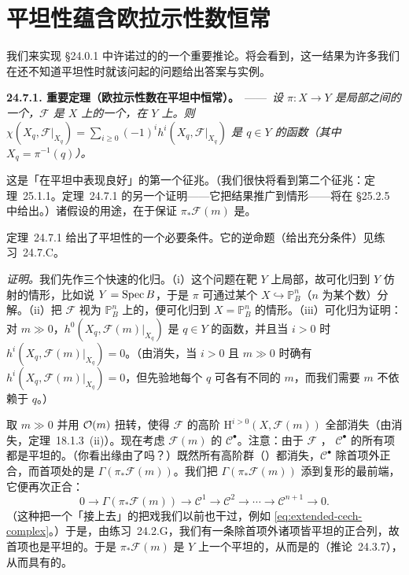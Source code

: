
\section{平坦性蕴含欧拉示性数恒常}

我们来实现 \S24.0.1 中许诺过的\trFlatness{}的一个重要推论。将会看到，这一结果为许多我们在还不知道平坦性时就该问起的问题给出答案与实例。

\textbf{24.7.1. 重要定理（欧拉示性数在平坦\trFamily{}中恒常）。}\ ——\ \emph{设 $\pi\colon X\to Y$ 是局部\trNoether{}\trScheme{}之间的一个\trProjective{}\trMorphism，$\mathscr{F}$ 是 $X$ 上的一个\trCoherentSheaf，在 $Y$ 上\trFlat。则 $\chi(X_q,\mathscr{F}|_{X_q})=\sum_{i\ge 0}(-1)^i h^i(X_q,\mathscr{F}|_{X_q})$ 是 $q\in Y$ 的\trLocallyConstant{}函数（其中 $X_q=\pi^{-1}(q)$）。}

这是「\trCohomology{}在平坦\trFamily{}中表现良好」的第一个征兆。（我们很快将看到第二个征兆：\mbox{\trSemicontinuity{}定理~25.1.1}。\mbox{定理~24.7.1} 的另一个证明——它把结果推广到\trProper{}情形——将在 \S25.2.5 中给出。）诸\trNoether{}假设的用途，在于保证 $\pi_\ast\mathscr{F}(m)$ 是\trCoherentSheaf。

\mbox{定理~24.7.1} 给出了平坦性的一个必要条件。它的逆命题（给出充分条件）见\mbox{练习~24.7.C}。

\emph{证明。}\quad 我们先作三个快速的化归。（i）这个问题在靶 $Y$ 上局部，故可化归到 $Y$ 仿射的情形，比如说 $Y=\operatorname{Spec} B$，于是 $\pi$ 可通过某个\trClosedEmbedding{} $X\hookrightarrow\mathbb{P}^n_B$（$n$ 为某个数）分解。（ii）把 $\mathscr{F}$ 视为 $\mathbb{P}^n_B$ 上的\trSheaf，便可化归到 $X=\mathbb{P}^n_B$ 的情形。（iii）可化归为证明：对 $m\gg 0$，$h^0(X_q,\mathscr{F}(m)|_{X_q})$ 是 $q\in Y$ 的\trLocallyConstant{}函数，并且当 $i>0$ 时 $h^i(X_q,\mathscr{F}(m)|_{X_q})=0$。（由\trSerre{}消失，当 $i>0$ 且 $m\gg 0$ 时确有 $h^i(X_q,\mathscr{F}(m)|_{X_q})=0$，但先验地每个 $q$ 可各有不同的 $m$，而我们需要 $m$ 不依赖于 $q$。）

取 $m\gg 0$ 并用 $\mathcal{O}(m)$ 扭转，使得 $\mathscr{F}$ 的高阶\trCohomology{} $\mathrm{H}^{i>0}(X,\mathscr{F}(m))$ 全部消失（由\trSerre{}消失，\mbox{定理~18.1.3}~(ii)）。现在考虑 $\mathscr{F}(m)$ 的\trCech\trComplexN{} $\mathscr{C}^{\bullet}$。注意：由于 $\mathscr{F}$ \trFlat，\trCech\trComplexN{} $\mathscr{C}^{\bullet}$ 的所有项都是平坦的。（你看出缘由了吗？）既然所有高阶\trCohomology{}群（\trHigherPushforward）都消失，$\mathscr{C}^{\bullet}$ 除首项外正合，而首项处的\trCohomology{}是 $\Gamma(\pi_\ast\mathscr{F}(m))$。我们把\trModule{} $\Gamma(\pi_\ast\mathscr{F}(m))$ 添到复形的最前端，它便再次正合：
\[
\tag{24.7.1.1}\label{eq:flat-cech-resolution}
0 \longrightarrow \Gamma(\pi_\ast\mathscr{F}(m)) \longrightarrow \mathscr{C}^1 \longrightarrow \mathscr{C}^2 \longrightarrow \cdots \longrightarrow \mathscr{C}^{n+1} \longrightarrow 0.
\]
（这种把一个\trModule{}「接上去」的把戏我们以前也干过，例如 \eqref{eq:extended-cech-complex}。）于是，由练习~24.2.G，我们有一条除首项外诸项皆平坦的正合列，故首项也是平坦的。于是 $\pi_\ast\mathscr{F}(m)$ 是 $Y$ 上一个平坦的\trCoherentSheaf，从而是\trLocallyFree{}的（\mbox{推论~24.3.7}），从而具有\trLocallyConstant{}的\trRank。

